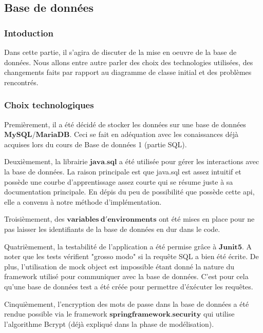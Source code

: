 \subsection{Base de données}
\subsubsection{Intoduction}
\begin{flushleft}
Dans cette partie, il s'agira de discuter de la mise en oeuvre de la base de données. Nous allons entre autre parler des choix des technologies utilisées, des changements faits par rapport au diagramme de classe initial et des problèmes rencontrés.
\end{flushleft}
\subsubsection{Choix technologiques}
\begin{flushleft}
    Premièrement, il a été décidé de stocker les données sur une base de données $\mathbf{MySQL}$/$\mathbf{MariaDB}$. Ceci se fait en adéquation avec les conaissances déjà acquises lors du cours de Base de données 1 (partie SQL). 
\end{flushleft}
\begin{flushleft}
    Deuxièmement, la librairie $\mathbf{java.sql}$ a été utilisée pour gérer les interactions avec la base de données. La raison principale est que java.sql est assez intuitif et possède une courbe d'apprentissage assez courte qui se résume juste à sa documentation principale. En dépis du peu de possibilité que possède cette api, elle a convenu à notre méthode d'implémentation.
\end{flushleft}
\begin{flushleft}
    Troisièmement, des $\mathbf{variables \ d'environments}$ ont été mises en place pour ne pas laisser les identifiants de la base de données en dur dans le code.
\end{flushleft}
\begin{flushleft}
    Quatrièmement, la testabilité de l'application a été permise grâce à $\mathbf{Junit5}$. A noter que les tests vérifient "grosso modo" si la requête SQL a bien été écrite. De plus, l'utilisation de mock object est impossible étant donné la nature du framework utilisé pour communiquer avec la base de données. C'est pour cela qu'une base de données test a été créée pour permettre d'éxécuter les requêtes.
\end{flushleft}
\begin{flushleft}
    Cinquièmement, l'encryption des mots de passe dans la base de données a été rendue possible via le framework $\mathbf{springframework.security}$ qui utilise l'algorithme Bcrypt (déjà expliqué dans la phase de modélisation).
\end{flushleft}

